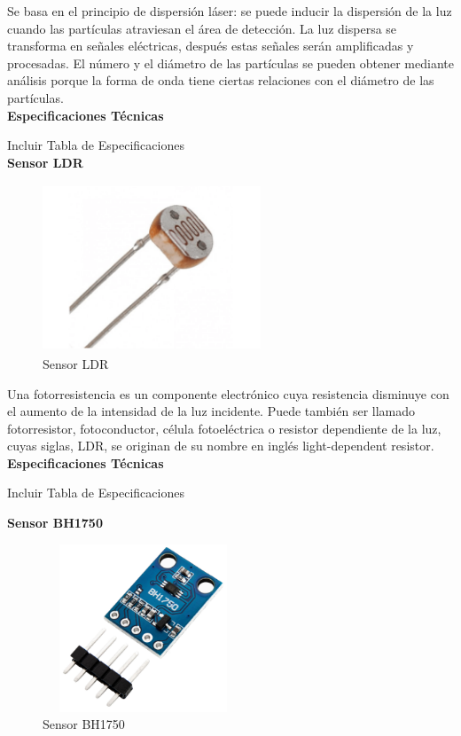 Se basa en el principio de dispersión láser: se puede inducir la dispersión de la luz cuando las partículas atraviesan el área de detección. La luz dispersa se transforma en señales eléctricas, después estas señales serán amplificadas y procesadas. El número y el diámetro de las partículas se pueden obtener mediante análisis porque la forma de onda tiene ciertas relaciones con el diámetro de las partículas.\\

\textbf{Especificaciones Técnicas}

Incluir Tabla de Especificaciones\\

\textbf{Sensor LDR} %

\begin{figure}[h]
      \centering
      \includegraphics[width=6.5cm, height=5cm]{imagenes/sensor LDR.png}
      \caption{Sensor LDR}
      \label{imag:LDR}
   \end{figure}

Una fotorresistencia es un componente electrónico cuya resistencia disminuye con el aumento de la intensidad de la luz incidente. Puede también ser llamado fotorresistor, fotoconductor, célula fotoeléctrica o resistor dependiente de la luz, cuyas siglas, LDR, se originan de su nombre en inglés light-dependent resistor.\\

\textbf{Especificaciones Técnicas}

Incluir Tabla de Especificaciones\\

\vspace{4cm}

\textbf{Sensor BH1750} %

\begin{figure}[h]
      \centering
      \includegraphics[width=6cm, height=5cm]{imagenes/Sensor BH1750.jpg}
      \caption{Sensor BH1750}
      \label{imag:BH1750}
   \end{figure}

